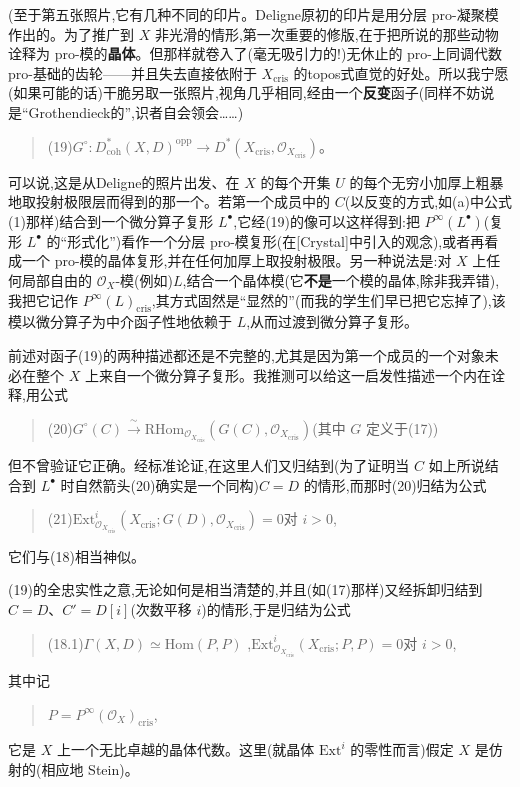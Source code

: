 \dmark{}(至于第五张照片,它有几种不同的印片。Deligne原初的印片是用分层 pro-凝聚模作出的。为了推广到 $X$ 非光滑的情形,第一次重要的修版,在于把所说的那些动物诠释为 pro-模的\textbf{晶体}。但那样就卷入了(毫无吸引力的!)无休止的 pro-上同调代数 pro-基础的齿轮——并且失去直接依附于 $X_{\mathrm{cris}}$ 的topos式直觉的好处。所以我宁愿(如果可能的话)干脆另取一张照片,视角几乎相同,经由一个\textbf{反变}函子(同样不妨说是“Grothendieck的”,识者自会领会……)
\begin{quote}
(19)\quad $G^{\circ} : D^{*}_{\mathrm{coh}}(X,D)^{\mathrm{opp}}\longrightarrow D^{*}(X_{\mathrm{cris}},\mathcal{O}_{X_{\mathrm{cris}}})$。
\end{quote}
可以说,这是从Deligne的照片出发、在 $X$ 的每个开集 $U$ 的每个无穷小加厚上粗暴地取投射极限层而得到的那一个。若第一个成员中的 $C$(以反变的方式,如(a)中公式(1)那样)结合到一个微分算子复形 $L^{\bullet}$,它经(19)的像可以这样得到:把 $P^{\infty}(L^{\bullet})$(复形 $L^{\bullet}$ 的“形式化”)看作一个分层 pro-模复形(在[Crystal]中引入的观念),或者再看成一个 pro-模的晶体复形,并在任何加厚上取投射极限。另一种说法是:对 $X$ 上任何局部自由的 $\mathcal{O}_{X}$-模(例如)$L$,结合一个晶体模(它\textbf{不是}一个模的晶体,除非我弄错),我把它记作 $P^{\infty}(L)_{\mathrm{cris}}$,其方式固然是“显然的”(而我的学生们早已把它忘掉了),该模以微分算子为中介函子性地依赖于 $L$,从而过渡到微分算子复形。

\noindent 前述对函子(19)的两种描述都还是不完整的,尤其是因为第一个成员的一个对象未必在整个 $X$ 上来自一个微分算子复形。我推测可以给这一启发性描述一个内在诠释,用公式
\begin{quote}
(20)\quad $G^{\circ}(C)\xrightarrow{\ \sim\ }\mathrm{RHom}_{\mathcal{O}_{X_{\mathrm{cris}}}}(G(C),\mathcal{O}_{X_{\mathrm{cris}}})$\quad (其中 $G$ 定义于(17))
\end{quote}
但不曾验证它正确。经标准论证,在这里人们又归结到(为了证明当 $C$ 如上所说结合到 $L^{\bullet}$ 时自然箭头(20)确实是一个同构)$C=D$ 的情形,而那时(20)归结为公式\dmark{}
\begin{quote}
(21)\quad $\mathrm{Ext}^{i}_{\mathcal{O}_{X_{\mathrm{cris}}}}(X_{\mathrm{cris}};G(D),\mathcal{O}_{X_{\mathrm{cris}}})=0$\quad 对 $i>0$,
\end{quote}
它们与(18)相当神似。

\noindent (19)的全忠实性之意,无论如何是相当清楚的,并且(如(17)那样)又经拆卸归结到 $C=D$、$C'=D[i]$(次数平移 $i$)的情形,于是归结为公式
\begin{quote}
(18.1)\quad $\Gamma(X,D)\simeq \mathrm{Hom}(P,P)$ ,\quad $\mathrm{Ext}^{i}_{\mathcal{O}_{X_{\mathrm{cris}}}}(X_{\mathrm{cris}};P,P)=0$\quad 对 $i>0$,
\end{quote}
其中记
\begin{quote}
$P=P^{\infty}(\mathcal{O}_{X})_{\mathrm{cris}}$,
\end{quote}
它是 $X$ 上一个无比卓越的晶体代数。这里(就晶体 $\mathrm{Ext}^{i}$ 的零性而言)假定 $X$ 是仿射的(相应地 Stein)。


